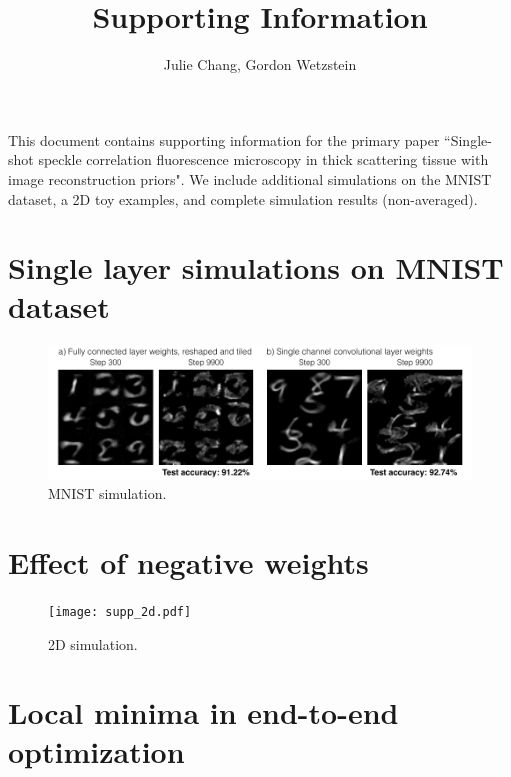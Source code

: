 \documentclass{article}
\title{Supporting Information}
\author{Julie Chang, Gordon Wetzstein}
\begin{document}
\maketitle

This document contains supporting information for the primary paper ``Single-shot speckle correlation fluorescence microscopy in thick scattering tissue with image reconstruction priors". We include additional simulations on the MNIST dataset, a 2D toy examples, and complete simulation results (non-averaged). 


\section{Single layer simulations on MNIST dataset}



\begin{figure}[h]
\centering
\includegraphics[width=\linewidth]{mnist.pdf}
\caption{MNIST simulation.}
\label{fig:mnist}
\end{figure}


\section{Effect of negative weights}

\begin{figure}[h]
\centering
\texttt{[image: supp\_2d.pdf]}
\caption{2D simulation.}
\label{fig:2d}
\end{figure}


\section{Local minima in end-to-end optimization}
\end{document}
